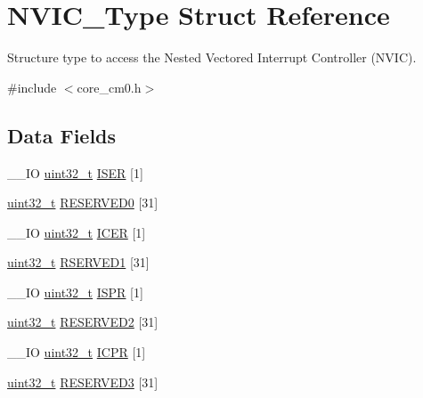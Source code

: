 \hypertarget{struct_n_v_i_c___type}{\section{N\-V\-I\-C\-\_\-\-Type Struct Reference}
\label{struct_n_v_i_c___type}
}


Structure type to access the Nested Vectored Interrupt Controller (N\-V\-I\-C).  




{\ttfamily \#include $<$core\-\_\-cm0.\-h$>$}

\subsection*{Data Fields}
\begin{DoxyCompactItemize}
\item 
\-\_\-\-\_\-\-I\-O \hyperlink{stdint_8h_a435d1572bf3f880d55459d9805097f62}{uint32\-\_\-t} \hyperlink{struct_n_v_i_c___type_aaff305f50a7117272e5523ec17cff9ec}{I\-S\-E\-R} \mbox{[}1\mbox{]}
\item 
\hyperlink{stdint_8h_a435d1572bf3f880d55459d9805097f62}{uint32\-\_\-t} \hyperlink{struct_n_v_i_c___type_adbb4fba725419a6bb67635b05d6f1131}{R\-E\-S\-E\-R\-V\-E\-D0} \mbox{[}31\mbox{]}
\item 
\-\_\-\-\_\-\-I\-O \hyperlink{stdint_8h_a435d1572bf3f880d55459d9805097f62}{uint32\-\_\-t} \hyperlink{struct_n_v_i_c___type_a856fba9cb1acc608fc03d8f2451bb16a}{I\-C\-E\-R} \mbox{[}1\mbox{]}
\item 
\hyperlink{stdint_8h_a435d1572bf3f880d55459d9805097f62}{uint32\-\_\-t} \hyperlink{struct_n_v_i_c___type_af524cfb2fdc825d4812449d2e4544a33}{R\-S\-E\-R\-V\-E\-D1} \mbox{[}31\mbox{]}
\item 
\-\_\-\-\_\-\-I\-O \hyperlink{stdint_8h_a435d1572bf3f880d55459d9805097f62}{uint32\-\_\-t} \hyperlink{struct_n_v_i_c___type_aa98673f8401e00b2dc73003a4d747e0b}{I\-S\-P\-R} \mbox{[}1\mbox{]}
\item 
\hyperlink{stdint_8h_a435d1572bf3f880d55459d9805097f62}{uint32\-\_\-t} \hyperlink{struct_n_v_i_c___type_ac347bab19adf93f1ed4aa2e719f20c66}{R\-E\-S\-E\-R\-V\-E\-D2} \mbox{[}31\mbox{]}
\item 
\-\_\-\-\_\-\-I\-O \hyperlink{stdint_8h_a435d1572bf3f880d55459d9805097f62}{uint32\-\_\-t} \hyperlink{struct_n_v_i_c___type_a7483899bfdf859f059384dd9aacd0072}{I\-C\-P\-R} \mbox{[}1\mbox{]}
\item 
\hyperlink{stdint_8h_a435d1572bf3f880d55459d9805097f62}{uint32\-\_\-t} \hyperlink{struct_n_v_i_c___type_a0f3f8095a2d0128337d7c3762a6fbd33}{R\-E\-S\-E\-R\-V\-E\-D3} \mbox{[}31\mbox{]}

\end{DoxyCompactItemize}
